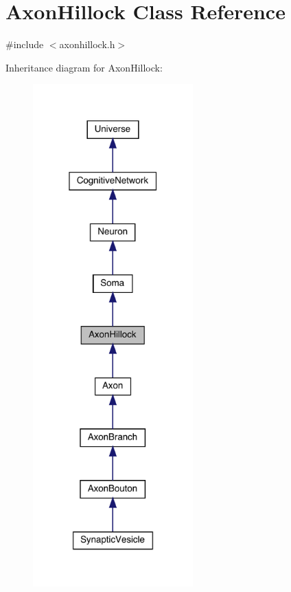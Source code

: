 \hypertarget{class_axon_hillock}{}\section{Axon\+Hillock Class Reference}
\label{class_axon_hillock}


{\ttfamily \#include $<$axonhillock.\+h$>$}



Inheritance diagram for Axon\+Hillock\+:\nopagebreak
\begin{figure}[H]
\begin{center}
\leavevmode
\includegraphics[width=175pt]{class_axon_hillock__inherit__graph}
\end{center}
\end{figure}


